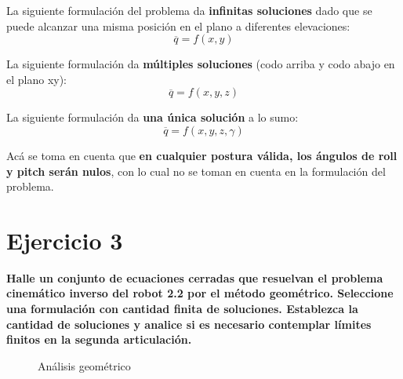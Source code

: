 \documentclass[a4paper,12pt]{article}
\begin{document}
La siguiente formulación del problema da \textbf{infinitas soluciones} dado que se puede alcanzar una misma posición en el plano a diferentes elevaciones:
\begin{equation*}
    \overline{q} = f(x, y)
\end{equation*}

La siguiente formulación da \textbf{múltiples soluciones} (codo arriba y codo abajo en el plano xy):
\begin{equation*}
    \overline{q} = f(x, y, z)
\end{equation*}

La siguiente formulación da \textbf{una única solución} a lo sumo:
\begin{equation*}
    \overline{q} = f(x, y, z, \gamma)
\end{equation*}

Acá se toma en cuenta que \textbf{en cualquier postura válida, los ángulos de roll y pitch serán nulos}, con lo cual no se toman en cuenta en la formulación del problema.

\section{Ejercicio 3}
\textbf{Halle un conjunto de ecuaciones cerradas que resuelvan el problema
cinemático inverso del robot 2.2 por el método geométrico. Seleccione una formulación con
cantidad finita de soluciones. Establezca la cantidad de soluciones y analice si es necesario
contemplar límites finitos en la segunda articulación.}

\begin{figure}[H]
    \centering
    \begin{adjustbox}{scale = 0.55, max width=\columnwidth}
    \end{adjustbox}
    \caption{Análisis geométrico}
\end{figure}
\end{document}
